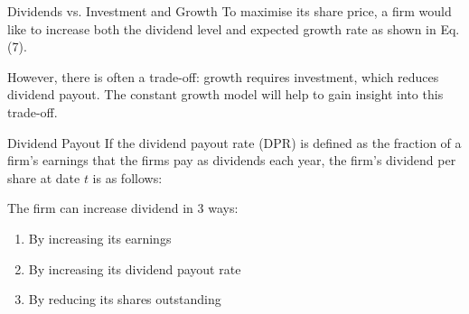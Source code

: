\documentclass[9pt,aspectratio=169]{beamer}
\begin{document}
\begin{frame}{Dividends vs. Investment and Growth}
To maximise its share price, a firm would like to increase both the dividend level and
expected growth rate as shown in Eq.(7).

\vspace{0.9em}
\begin{center}
\end{center}

\vspace{0.6em}
However, there is often a trade-off: growth requires investment, which reduces dividend
payout. The constant growth model will help to gain insight into this trade-off.
\end{frame}


\begin{frame}{Dividend Payout}
If the dividend payout rate (DPR) is defined as the fraction of a firm's earnings that the
firms pay as dividends each year, the firm's dividend per share at date $t$ is as follows:

\begin{center}
\end{center}

\vspace{0.6em}
The firm can increase dividend in 3 ways:
\begin{enumerate}
\item By increasing its earnings
\item By increasing its dividend payout rate
\item By reducing its shares outstanding
\end{enumerate}
\end{frame}
\end{document}
